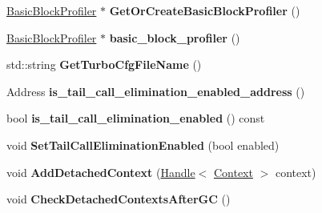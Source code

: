 \begin{DoxyCompactItemize}
\item 
\hyperlink{classv8_1_1internal_1_1_basic_block_profiler}{Basic\+Block\+Profiler} $\ast$ {\bfseries Get\+Or\+Create\+Basic\+Block\+Profiler} ()\hypertarget{classv8_1_1internal_1_1_isolate_a0f49e48f12158e4e0d36609bc876cf1b}{}\label{classv8_1_1internal_1_1_isolate_a0f49e48f12158e4e0d36609bc876cf1b}

\item 
\hyperlink{classv8_1_1internal_1_1_basic_block_profiler}{Basic\+Block\+Profiler} $\ast$ {\bfseries basic\+\_\+block\+\_\+profiler} ()\hypertarget{classv8_1_1internal_1_1_isolate_a8c75a0ad3c81d87b5eaa822c0f829027}{}\label{classv8_1_1internal_1_1_isolate_a8c75a0ad3c81d87b5eaa822c0f829027}

\item 
std\+::string {\bfseries Get\+Turbo\+Cfg\+File\+Name} ()\hypertarget{classv8_1_1internal_1_1_isolate_aac0b43a67fa85d593329229e4f537cee}{}\label{classv8_1_1internal_1_1_isolate_aac0b43a67fa85d593329229e4f537cee}

\item 
Address {\bfseries is\+\_\+tail\+\_\+call\+\_\+elimination\+\_\+enabled\+\_\+address} ()\hypertarget{classv8_1_1internal_1_1_isolate_aa49f8ee5aa23e245de785de39b92d2ab}{}\label{classv8_1_1internal_1_1_isolate_aa49f8ee5aa23e245de785de39b92d2ab}

\item 
bool {\bfseries is\+\_\+tail\+\_\+call\+\_\+elimination\+\_\+enabled} () const \hypertarget{classv8_1_1internal_1_1_isolate_aa01764c79817ad7a9a6284f959314769}{}\label{classv8_1_1internal_1_1_isolate_aa01764c79817ad7a9a6284f959314769}

\item 
void {\bfseries Set\+Tail\+Call\+Elimination\+Enabled} (bool enabled)\hypertarget{classv8_1_1internal_1_1_isolate_ac871e5d37facd3a923fb1b354c566b55}{}\label{classv8_1_1internal_1_1_isolate_ac871e5d37facd3a923fb1b354c566b55}

\item 
void {\bfseries Add\+Detached\+Context} (\hyperlink{classv8_1_1internal_1_1_handle}{Handle}$<$ \hyperlink{classv8_1_1internal_1_1_context}{Context} $>$ context)\hypertarget{classv8_1_1internal_1_1_isolate_a5a8bf062e8557dfc4ce8f17c5bc90c33}{}\label{classv8_1_1internal_1_1_isolate_a5a8bf062e8557dfc4ce8f17c5bc90c33}

\item 
void {\bfseries Check\+Detached\+Contexts\+After\+GC} ()\hypertarget{classv8_1_1internal_1_1_isolate_aabb6e95b866925ad45f3c80373bde61b}{}\label{classv8_1_1internal_1_1_isolate_aabb6e95b866925ad45f3c80373bde61b}


\end{DoxyCompactItemize}
